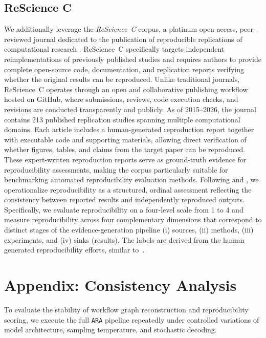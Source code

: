 \documentclass{article}
\begin{document}
\subsection{ReScience C}

We additionally leverage the \textit{ReScience~C} corpus, a platinum open-access, peer-reviewed journal dedicated to the publication of reproducible replications of computational research \citep{rougier2018rescience}. 
ReScience~C specifically targets independent reimplementations of previously published studies and requires authors to provide complete open-source code, documentation, and replication reports verifying whether the original results can be reproduced. 
Unlike traditional journals, ReScience~C operates through an open and collaborative publishing workflow hosted on GitHub, where submissions, reviews, code execution checks, and revisions are conducted transparently and publicly. 
As of 2015–2026, the journal contains 213 published replication studies spanning multiple computational domains. 
Each article includes a human-generated reproduction report together with executable code and supporting materials, allowing direct verification of whether figures, tables, and claims from the target paper can be reproduced. 
These expert-written reproduction reports serve as ground-truth evidence for reproducibility assessments, making the corpus particularly suitable for benchmarking automated reproducibility evaluation methods.
%
Following \citep{hu2025repro} and \citep{brodeur2024mass}, we operationalize reproducibility as a structured, ordinal assessment reflecting the consistency between reported results and independently reproduced outputs. Specifically, we evaluate reproducibility on a four-level scale from 1 to 4 and measure reproducibility across four complementary dimensions that correspond to distinct stages of the evidence-generation pipeline (i) sources, (ii) methods, (iii) experiments, and (iv) sinks (results).
The labels are derived from the human generated reproducibility efforts, similar to~\citep{hu2025repro}.




\clearpage
\section{Appendix: Consistency Analysis} \label{appendix:consistency-analysis}

To evaluate the stability of workflow graph reconstruction and reproducibility scoring, we execute the full \texttt{ARA} pipeline repeatedly under controlled variations of model architecture, sampling temperature, and stochastic decoding.
\end{document}
